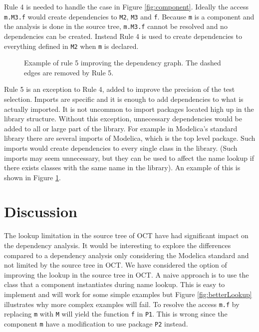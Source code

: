 \documentclass{cslthse-msc}
\begin{document}
Rule 4 is needed to handle the case in Figure \ref{fig:component}. Ideally the access \texttt{m.M3.f} would create dependencies to \texttt{M2}, \texttt{M3} and \texttt{f}. Because \texttt{m} is a component and the analysis is done in the source tree, \texttt{m.M3.f} cannot be resolved and no dependencies can be created. Instead Rule 4 is used to create dependencies to everything defined in \texttt{M2} when \texttt{m} is declared.

\begin{figure}[!htbp]
    \centering
    \qquad
    \subfloat{\raisebox{4.0 cm}{}}
    \caption{Example of rule 5 improving the dependency graph. The dashed edges are removed by Rule 5.}
    \label{fig:rule5}
\end{figure}

Rule 5 is an exception to Rule 4, added to improve the precision of the test selection. Imports are specific and it is enough to add dependencies to what is actually imported. It is not uncommon to import packages located high up in the library structure. Without this exception, unnecessary dependencies would be added to all or large part of the library. For example in Modelica's standard library there are several imports of Modelica, which is the top level package. Such imports would create dependencies to every single class in the library. (Such imports may seem unnecessary, but they can be used to affect the name lookup if there exists classes with the same name in the library). An example of this is shown in Figure \ref{fig:rule5}.

\section{Discussion}
The lookup limitation in the source tree of OCT have had significant impact on the dependency analysis. It would be interesting to explore the differences compared to a dependency analysis only considering the Modelica standard and not limited by the source tree in OCT. We have considered the option of improving the lookup in the source tree in OCT. A naive approach is to use the class that a component instantiates during name lookup. This is easy to implement and will work for some simple examples but Figure \ref{fig:betterLookup} illustrates why more complex examples will fail. To resolve the access \texttt{m.f} by replacing \texttt{m} with \texttt{M} will yield the function \texttt{f} in \texttt{P1}. This is wrong since the component \texttt{m} have a modification to use package \texttt{P2} instead.
\end{document}
